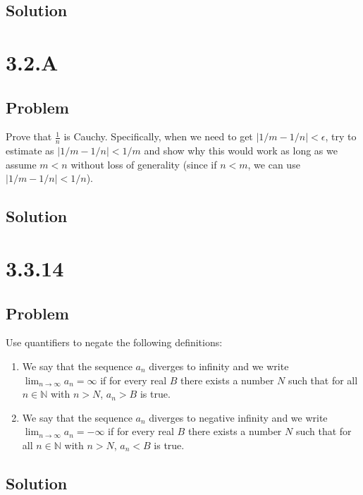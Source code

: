 \documentclass[12pt]{article}
\newcommand{\N}    [0]{\mathbb{N}                   }
\begin{document}
\subsection*{Solution}




\section*{3.2.A}

\subsection*{Problem}
Prove that $\frac{1}{n}$ is Cauchy. Specifically, when we need to get $|1/m - 1/n| < \epsilon$, try to estimate as $|1/m - 1/n| < 1/m$ and show why this would work as long as we assume $m<n$ without loss of generality (since if $n<m$, we can use $|1/m - 1/n| < 1/n$).

\subsection*{Solution}



\section*{3.3.14}

\subsection*{Problem}
Use quantifiers to negate the following definitions:

\begin{enumerate}
    \item We say that the sequence $a_n$ diverges to infinity and we write $\lim_{n \to \infty} a_n = \infty$ if for every real $B$ there exists a number $N$ such that for all $n \in \N$ with $n > N$, $a_n > B$ is true.
    \item We say that the sequence $a_n$ diverges to negative infinity and we write $\lim_{n \to \infty} a_n = -\infty$ if for every real $B$ there exists a number $N$ such that for all $n \in \N$ with $n > N$, $a_n < B$ is true.
\end{enumerate}

\subsection*{Solution}
\end{document}

